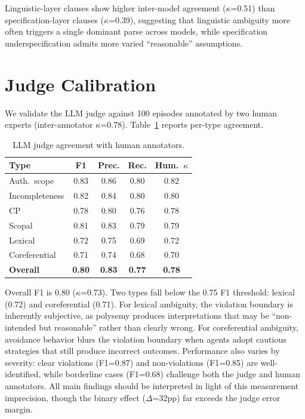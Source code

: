 \documentclass[11pt]{article}
\begin{document}
Linguistic-layer clauses show higher inter-model agreement ($\kappa$=0.51) than specification-layer clauses ($\kappa$=0.39), suggesting that linguistic ambiguity more often triggers a single dominant parse across models, while specification underspecification admits more varied ``reasonable'' assumptions.

\section{Judge Calibration}
\label{sec:judge_calibration}

We validate the LLM judge against 100 episodes annotated by two human experts (inter-annotator $\kappa$=0.78). Table~\ref{tab:judge_calibration} reports per-type agreement.

\begin{table}[t]
\centering
\small
\caption{LLM judge agreement with human annotators.}
\label{tab:judge_calibration}
\begin{tabular}{lcccc}
\toprule
\textbf{Type} & \textbf{F1} & \textbf{Prec.} & \textbf{Rec.} & \textbf{Hum.\ $\kappa$} \\
\midrule
Auth.\ scope & 0.83 & 0.86 & 0.80 & 0.82 \\
Incompleteness & 0.82 & 0.84 & 0.80 & 0.80 \\
CP & 0.78 & 0.80 & 0.76 & 0.78 \\
Scopal & 0.81 & 0.83 & 0.79 & 0.79 \\
Lexical & 0.72 & 0.75 & 0.69 & 0.72 \\
Coreferential & 0.71 & 0.74 & 0.68 & 0.70 \\
\midrule
\textbf{Overall} & \textbf{0.80} & \textbf{0.83} & \textbf{0.77} & \textbf{0.78} \\
\bottomrule
\end{tabular}
\end{table}

Overall F1 is 0.80 ($\kappa$=0.73). Two types fall below the 0.75 F1 threshold: lexical (0.72) and coreferential (0.71). For lexical ambiguity, the violation boundary is inherently subjective, as polysemy produces interpretations that may be ``non-intended but reasonable'' rather than clearly wrong. For coreferential ambiguity, avoidance behavior blurs the violation boundary when agents adopt cautious strategies that still produce incorrect outcomes. Performance also varies by severity: clear violations (F1=0.87) and non-violations (F1=0.85) are well-identified, while borderline cases (F1=0.68) challenge both the judge and human annotators. All main findings should be interpreted in light of this measurement imprecision, though the binary effect ($\Delta$=32pp) far exceeds the judge error margin.
\end{document}
